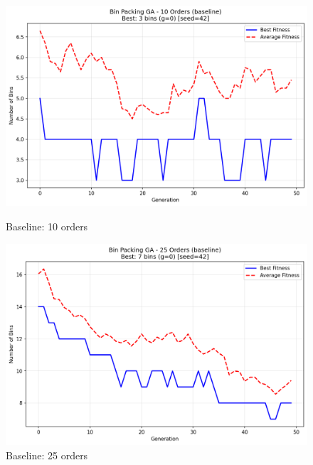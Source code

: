\documentclass[journal,12pt,onecolumn]{IEEEtran}
\begin{document}
\begin{figure}[htbp]
\begin{minipage}{0.48\textwidth}
    \centering
    \includegraphics[width=\textwidth]{bpp_10items_baseline_seed42.png}
    \caption{Baseline: 10 orders}
    \label{fig:baseline_10}
\end{minipage}\hfill
\begin{minipage}{0.48\textwidth}
    \centering
    \includegraphics[width=\textwidth]{bpp_25items_baseline_seed42.png}
    \caption{Baseline: 25 orders}
    \label{fig:baseline_25}
\end{minipage}
\end{figure}
\end{document}
